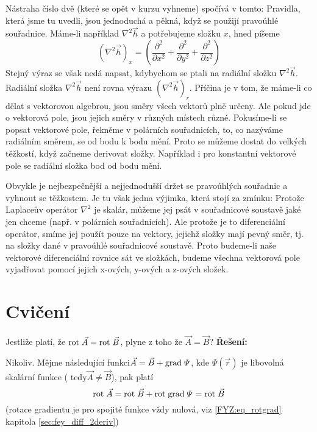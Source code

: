     Nástraha číslo dvě (které se opět v kurzu vyhneme) spočívá v tomto: Pravidla, která jsme tu uvedli, 
    jsou jednoduchá a pěkná, když se použijí pravoúhlé souřadnice. Máme-li například \(\nabla^2\vec{h}\) a 
    potřebujeme složku \(x\), hned píšeme
    \begin{equation*}
      (\nabla^2\vec{h})_x = \left(\frac{\partial^2}{\partial x^2} + 
                                  \frac{\partial^2}{\partial y^2} + 
                                  \frac{\partial^2}{\partial z^2} 
                            \right)
    \end{equation*}
    Stejný výraz se však nedá napsat, kdybychom se ptali na radiální složku \(\nabla^2\vec{h}\). Radiální 
    složka \(\nabla^2\vec{h}\) není rovna výrazu \((\nabla^2\vec{h})_r\). Příčina je v tom, že máme-li co 
    dělat s vektorovou algebrou, jsou směry všech vektorů plně určeny. Ale pokud jde o vektorová pole, jsou 
    jejich směry v různých místech různé. Pokusíme-li se popsat vektorové pole, řekněme v polárních 
    souřadnicích, to, co nazýváme radiálním směrem, se od bodu k bodu mění. Proto se můžeme dostat do 
    velkých těžkostí, když začneme derivovat složky. Například i pro konstantní vektorové pole se radiální 
    složka bod od bodu mění.

    Obvykle je nejbezpečnější a nejjednodušší držet se pravoúhlých souřadnic a vyhnout se těžkostem. Je tu 
    však jedna výjimka, která stojí za zmínku: Protože Laplaceův operátor \(\nabla^2\) je skalár, můžeme 
    jej psát v souřadnicové soustavě jaké jen chceme (např. v polárních souřadnicích). Ale protože je to 
    diferenciální operátor, smíme jej použít pouze na vektory, jejichž složky mají pevný směr, tj. na složky 
    dané v pravoúhlé souřadnicové soustavě. Proto budeme-li naše vektorové diferenciální rovnice sát ve 
    složkách, budeme všechna vektorová pole vyjadřovat pomocí jejich x-ových, y-ových a z-ových složek.
  
  \section{Cvičení}
    \begin{example}
      Jestliže platí, že \(\mathrm{rot}\;\vec{A} = \mathrm{rot}\;\vec{B}\), plyne z toho že \(\vec{A}=\vec{B}\)?\newline
      \textbf{Řešení:}
      
      Nikoliv. Mějme následující funkci\(\vec{A} = \vec{B} + \mathrm{grad\;}\varPsi\), kde \(\varPsi(\vec{r})\) je 
      libovolná skalární funkce ( tedy\(\vec{A}\neq\vec{B}\)), pak platí
      \[\mathrm{rot}\;\vec{A} = \mathrm{rot}\;\vec{B} +\mathrm{rot}\;\mathrm{grad\;}\varPsi = \mathrm{rot}\;\vec{B}\] (rotace gradientu je pro spojité funkce 
      vždy nulová, viz \ref{FYZ:eq_rotgrad} kapitola \ref{sec:fey_diff_2deriv})
      
    \end{example}
\printbibliography[heading=subbibliography]  